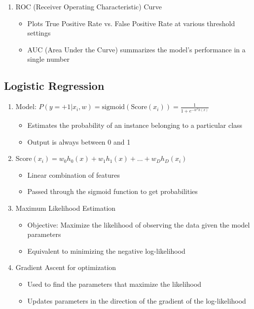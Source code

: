 \documentclass{article}
\begin{document}
\begin{enumerate}
    \item ROC (Receiver Operating Characteristic) Curve
    \begin{itemize}
        \item Plots True Positive Rate vs. False Positive Rate at various threshold settings
        \item AUC (Area Under the Curve) summarizes the model's performance in a single number
    \end{itemize}
\end{enumerate}

\subsection{Logistic Regression}
\begin{enumerate}
    \item Model: $P(y=+1|x_i, w) = \text{sigmoid}(\text{Score}(x_i)) = \frac{1}{1 + e^{-w^T h(x)}}$
    \begin{itemize}
        \item Estimates the probability of an instance belonging to a particular class
        \item Output is always between 0 and 1
    \end{itemize}
    
    \item Score$(x_i) = w_0 h_0(x) + w_1 h_1(x) + ... + w_D h_D(x_i)$
    \begin{itemize}
        \item Linear combination of features
        \item Passed through the sigmoid function to get probabilities
    \end{itemize}
    
    \item Maximum Likelihood Estimation
    \begin{itemize}
        \item Objective: Maximize the likelihood of observing the data given the model parameters
        \item Equivalent to minimizing the negative log-likelihood
    \end{itemize}
    
    \item Gradient Ascent for optimization
    \begin{itemize}
        \item Used to find the parameters that maximize the likelihood
        \item Updates parameters in the direction of the gradient of the log-likelihood
    \end{itemize}
    

\end{enumerate}
\end{document}
